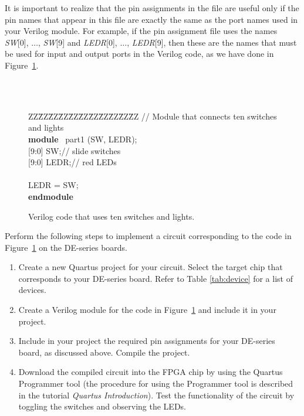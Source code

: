 \documentclass[epsfig,10pt,fullpage]{article}
\begin{document}
It is important to realize that the pin assignments in the
file are useful only if the pin names that appear in this file
are exactly the same as the port names used in your Verilog module.
For example, if the pin assignment file uses the names {\it SW}[0], $\ldots$, {\it SW}[9] 
and {\it LEDR}[0], $\ldots$, {\it LEDR}[9], then these are the names that must be used
for input and output ports in the Verilog code, as we have done in Figure~\ref{fig:1}.

~\\
~\\
\begin{figure}[H]
\begin{center}
\begin{minipage}[t]{12.5 cm}
\begin{tabbing}
ZZ\=ZZ\=ZZ\=ZZ\=ZZ\=ZZ\=ZZ\=ZZ\=ZZ\=ZZ\=ZZ\kill
// Module that connects ten switches and lights\\
{\bf module} ~part1 (SW, LEDR);\\
 [9:0] SW;\>\>\>\>\>\>\>\>// slide switches\\
 [9:0] LEDR;\>\>\>\>\>\>\>\>// red LEDs\\
~\\
 LEDR = SW;\\
{\bf endmodule}
\end{tabbing}
\end{minipage}
	\caption{Verilog code that uses ten switches and lights.}
	\label {fig:1}
\end{center}
\end{figure}

\newpage
Perform the following steps to implement a circuit corresponding to the code
in  Figure~\ref{fig:1} on the DE-series boards.
\begin{enumerate}
\item Create a new Quartus project for your circuit. Select the target chip that corresponds to your DE-series board.
Refer to Table \ref{tab:device} for a list of devices.
\item Create a Verilog module for the code in  Figure~\ref{fig:1} and include it in your project.
\item Include in your project the required pin assignments for your DE-series board, as discussed
above. Compile the project.
\item Download the compiled circuit into the FPGA chip by using the Quartus Programmer
tool (the procedure for using the Programmer tool is described in
the tutorial {\it Quartus Introduction}). Test the functionality of the 
circuit by toggling the switches and observing the LEDs.
\end{enumerate}
\end{document}
